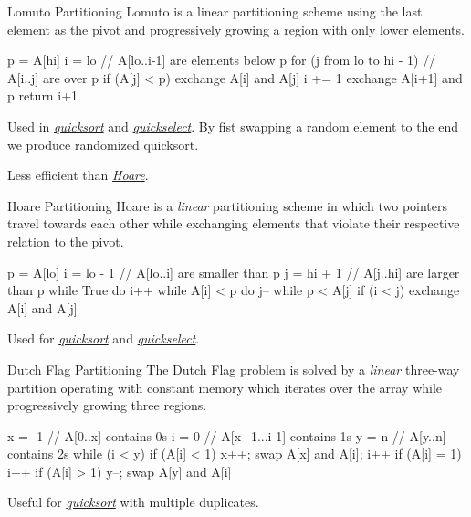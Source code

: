 \documentclass{cognito}
\begin{document}

\begin{note}{Lomuto Partitioning}
	Lomuto is a linear partitioning scheme using the last element as the pivot
	and progressively growing a region with only lower elements.
	\begin{largecode}
 p = A[hi]
 i = lo  // A[lo..i-1] are elements below p
 for (j from lo to hi - 1)  // A[i..j] are over p
 	if (A[j] < p)
		exchange A[i] and A[j]
		i += 1
exchange A[i+1] and p
return i+1
	\end{largecode}
	\begin{remark} Used in \hyperref[note:Quicksort]{\it quicksort} and \hyperref[note:Quickselect]{\it quickselect}.
		By fist swapping a random element to the end we produce randomized quicksort.
	\end{remark}
	\begin{remark} Less efficient than \hyperref[note:Hoare Partitioning]{\it Hoare}.
	\end{remark}
	\vspace{-5pt}
\end{note}

\begin{note}{Hoare Partitioning}
	Hoare is a \emph{linear} partitioning scheme in which two pointers travel towards each other
	while exchanging elements that violate their respective relation to the pivot.
	\begin{largecode}
 p = A[lo]
 i = lo - 1  // A[lo..i] are smaller than p
 j = hi + 1 // A[j..hi] are larger than p
 while True
 	do i++ while A[i] < p
	do j-- while p < A[j]
	if (i < j) exchange A[i] and A[j]
	\end{largecode}
	
	\begin{remark} Used for \hyperref[note:Quicksort]{\it quicksort} and \hyperref[note:Quickselect]{\it quickselect}. \end{remark}
	\vspace{-5pt}
\end{note}

\begin{note}{Dutch Flag Partitioning}
	The Dutch Flag problem is solved by a \emph{linear} three-way partition operating with constant memory which iterates over the array
	while progressively growing three regions.
	\begin{largecode}
 x = -1  // A[0..x] contains 0s
 i = 0   // A[x+1...i-1] contains 1s
 y = n   // A[y..n] contains 2s
 while (i < y)
 	if (A[i] < 1) { x++; swap A[x] and A[i]; i++ }
	if (A[i] = 1) { i++ }
	if (A[i] > 1) { y--; swap A[y] and A[i] }
	\end{largecode}
	\begin{remark} Useful for \hyperref[note:Quicksort]{\it quicksort} with multiple duplicates. \end{remark}
	\vspace{-5pt}
\end{note}
\end{document}
